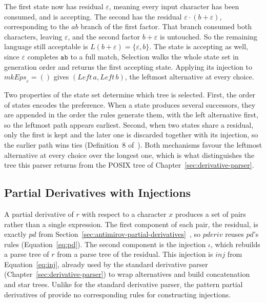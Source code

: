 The first state now has residual $\varepsilon$, 
meaning every input character has been consumed, and is accepting. 
The second has the residual $\varepsilon \cdot (b + \varepsilon)$, 
corresponding to the $ab$ branch of the first factor.
That branch consumed both characters, leaving $\varepsilon$, 
and the second factor $b + \varepsilon$ is untouched. 
So the remaining language still acceptable is $L(b + \varepsilon) = \{\varepsilon, b\}$.
The state is accepting as well, 
since $\varepsilon$ completes $\mathtt{ab}$ to a full match, 
Selection walks the whole state set in generation order 
and returns the first accepting state. 
Applying its injection to $\mathit{mkEps}_\varepsilon = ()$ 
gives $(\mathit{Left}\,a, \mathit{Left}\,b)$, 
the leftmost alternative at every choice.

Two properties of the state set determine which tree is selected. 
First, the order of states encodes the preference.
When a state produces several successors, 
they are appended in the order the rules generate them, 
with the left alternative first, 
so the leftmost path appears earliest.
Second, when two states share a residual, 
only the first is kept and the later one is discarded together with its injection, 
so the earlier path wins ties (Definition~8 of~\citealp{sulzmannlu2012}). 
Both mechanisms favour the leftmost alternative at every choice over the longest one,
which is what distinguishes the tree this parser returns 
from the POSIX tree of Chapter~\ref{sec:derivative-parser}.

%
%
%

\subsection{Partial Derivatives with Injections}
\label{sec:pderiv-tree-theory}

A partial derivative of $r$ with respect to a character $x$ 
produces a set of pairs rather than a single expression. 
The first component of each pair, the residual, 
is exactly $pd$ from Section~\ref{sec:antimirov-partial-derivatives}~\citep{antimirov1996},
so $\mathit{pderiv}$ reuses $pd$'s rules (Equation~\eqref{eq:pd}). 
The second component is the injection $\iota$, 
which rebuilds a parse tree of $r$ from a parse tree of the residual. 
This injection is $\mathit{inj}$ from Equation~\eqref{eq:inj},
already used by the standard derivative parser (Chapter~\ref{sec:derivative-parser})
to wrap alternatives and build concatenation and star trees.
Unlike for the standard derivative parser, 
the pattern partial derivatives of \citet[Fig.~11, p.~86]{sulzmannlu2012}
provide no corresponding rules for constructing injections.

